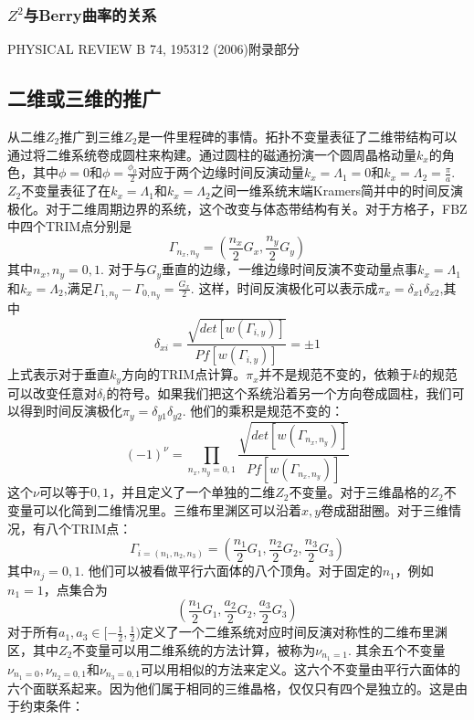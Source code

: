 \documentclass{article}
\numberwithin{equation}{subsection}
\begin{document}
\subsubsection*{$Z^2$与Berry曲率的关系}
PHYSICAL REVIEW B 74, 195312 (2006)附录部分

\subsection{二维或三维的推广}
从二维$Z_2$推广到三维$Z_2$是一件里程碑的事情。拓扑不变量表征了二维带结构可以通过将二维系统卷成圆柱来构建。通过圆柱的磁通扮演一个圆周晶格动量$k_x$的角色，其中$\phi=0$和$\phi=\frac{\phi_0}{2}$对应于两个边缘时间反演动量$k_x=\Lambda_1=0$和$k_x=\Lambda_2=\frac{\pi}{a}$. $Z_2$不变量表征了在$k_x=\Lambda_1$和$k_x=\Lambda_2$之间一维系统末端Kramers简并中的时间反演极化。对于二维周期边界的系统，这个改变与体态带结构有关。对于方格子，FBZ中四个TRIM点分别是
\begin{equation}
    \Gamma_{n_x,n_y}=\left(\frac{n_x}{2}G_x,\frac{n_y}{2}G_y\right)
\end{equation}
其中$n_x,n_y=0,1$. 对于与$G_y$垂直的边缘，一维边缘时间反演不变动量点事$k_x=\Lambda_1$和$k_x=\Lambda_2$,满足$\Gamma_{1,n_y}-\Gamma_{0,n_y}=\frac{G_x}{2}$. 这样，时间反演极化可以表示成$\pi_x=\delta_{x1}\delta_{x2}$,其中
\begin{equation}
    \delta_{xi}=\frac{\sqrt{det[w(\Gamma_{i,y})]}}{Pf[w(\Gamma_{i,y})]}=\pm1
\end{equation}
上式表示对于垂直$k_y$方向的TRIM点计算。$\pi_x$并不是规范不变的，依赖于$k$的规范可以改变任意对$\delta_i$的符号。如果我们把这个系统沿着另一个方向卷成圆柱，我们可以得到时间反演极化$\pi_y=\delta_{y1}\delta_{y2}$. 他们的乘积是规范不变的：
\begin{equation}
    (-1)^\nu=\prod_{n_x,n_y=0,1}\frac{\sqrt{det[w(\Gamma_{n_x,n_y})]}}{Pf[w(\Gamma_{n_x,n_y})]}
\end{equation}
这个$\nu$可以等于$0,1$，并且定义了一个单独的二维$Z_2$不变量。对于三维晶格的$Z_2$不变量可以化简到二维情况里。三维布里渊区可以沿着$x,y$卷成甜甜圈。对于三维情况，有八个TRIM点：
\begin{equation}
    \Gamma_{i=(n_1,n_2,n_3)}=\left(\frac{n_1}{2}G_1,\frac{n_2}{2}G_2,\frac{n_3}{2}G_3\right)
\end{equation}
其中$n_j=0,1$. 他们可以被看做平行六面体的八个顶角。对于固定的$n_1$，例如$n_1=1$，点集合为
\begin{equation}
    \left(\frac{n_1}{2}G_1,\frac{a_2}{2}G_2,\frac{a_3}{2}G_3\right)
\end{equation}
对于所有$a_1,a_3\in[-\frac{1}{2},\frac{1}{2})$定义了一个二维系统对应时间反演对称性的二维布里渊区，其中$Z_2$不变量可以用二维系统的方法计算，被称为$\nu_{n_1=1}$. 其余五个不变量$\nu_{n_1=0},\nu_{n_2=0,1}$和$\nu_{n_3=0,1}$可以用相似的方法来定义。这六个不变量由平行六面体的六个面联系起来。因为他们属于相同的三维晶格，仅仅只有四个是独立的。这是由于约束条件：
\end{document}
